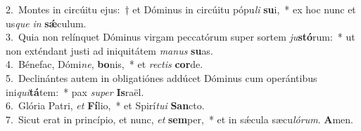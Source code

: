 {2.~}Montes in circúitu ejus:~† et Dóminus in circúitu pópu\textit{li} \textbf{su}i,~* ex hoc nunc et us\textit{que} \textit{in} \textbf{sǽ}culum.\\
{3.~}Quia non relínquet Dóminus virgam peccatórum super sortem \textit{ju}\textbf{stó}rum:~* ut non exténdant justi ad iniquitátem \textit{ma}\textit{nus} \textbf{su}as.\\
{4.~}Bénefac, Dómi\textit{ne}, \textbf{bo}nis,~* et \textit{re}\textit{ctis} \textbf{cor}de.\\
{5.~}Declinántes autem in obligatiónes addúcet Dóminus cum operántibus ini\textit{qui}\textbf{tá}tem:~* pax \textit{su}\textit{per} \textbf{Is}raël.\\
{6.~}Glória Patri, \textit{et} \textbf{Fí}lio,~* et Spirí\textit{tu}\textit{i} \textbf{San}cto.\\
{7.~}Sicut erat in princípio, et nunc, \textit{et} \textbf{sem}per,~* et in sǽcula sæcu\textit{ló}\textit{rum}. \textbf{A}men.\\
